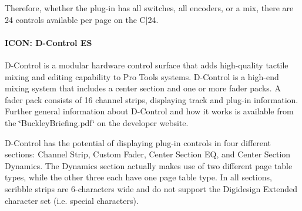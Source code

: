 Therefore, whether the plug-\/in has all switches, all encoders, or a mix, there are 24 controls available per page on the C$\vert$24.

\hypertarget{a00833_subsubsection__icon_dcontrol_es_}{}\paragraph{I\+C\+O\+N\+: D-\/\+Control ES}\label{a00833_subsubsection__icon_dcontrol_es_}
 D-\/\+Control is a modular hardware control surface that adds high-\/quality tactile mixing and editing capability to Pro Tools systems. D-\/\+Control is a high-\/end mixing system that includes a center section and one or more fader packs. A fader pack consists of 16 channel strips, displaying track and plug-\/in information. Further general information about D-\/\+Control and how it works is available from the \char`\"{}\+Buckley\+Briefing.\+pdf\char`\"{} on the developer website.

D-\/\+Control has the potential of displaying plug-\/in controls in four different sections\+: Channel Strip, Custom Fader, Center Section EQ, and Center Section Dynamics. The Dynamics section actually makes use of two different page table types, while the other three each have one page table type. In all sections, scribble strips are 6-\/characters wide and do not support the Digidesign Extended character set (i.\+e. special characters).


